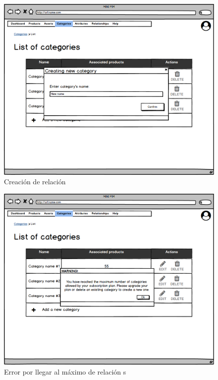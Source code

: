 \vspace{0.20cm}

\begin{figure}[H]
    \includegraphics[width=1\linewidth]{mockups/RF4.1_1.png}
    \caption{Creación de relación
}
   \end{figure}
\vspace{1.0cm}

\begin{figure}[H]
    \includegraphics[width=1\linewidth]{mockups/RF4.1_2.png}
    \caption{Error por llegar al máximo de relación
s}
   \end{figure}
\vspace{1.0cm}

\newpage %